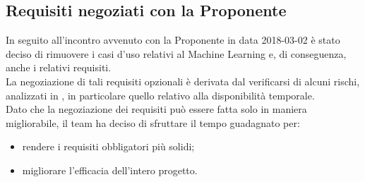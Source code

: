 \subsection{Requisiti negoziati con la Proponente} \label{negoziazione}
	In seguito all'incontro avvenuto con la Proponente in data 2018-03-02 è stato deciso di rimuovere i casi d'uso relativi al Machine 				Learning e, di conseguenza, anche i relativi requisiti.\\
	La negoziazione di tali requisiti opzionali è derivata dal verificarsi di alcuni rischi, analizzati in \vPianoDiProgetto, in particolare 			quello relativo alla disponibilità temporale.\\
	Dato che la negoziazione dei requisiti può essere fatta solo in maniera migliorabile, il team ha deciso di sfruttare il tempo guadagnato 		per:
	\begin{itemize}
		\item rendere i requisiti obbligatori più solidi;
		\item migliorare l'efficacia dell'intero progetto.
	\end{itemize}
            
